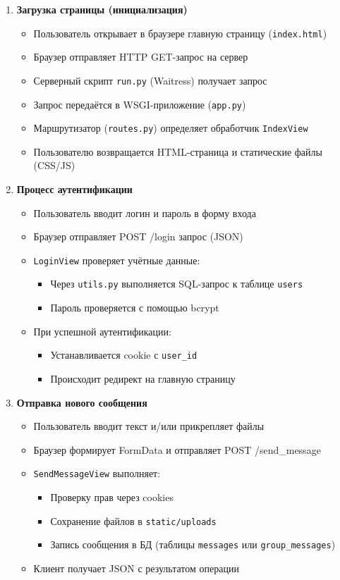 \begin{enumerate}[leftmargin=*,label=\textbf{\arabic*.}]
	\item \textbf{Загрузка страницы (инициализация)}
	\begin{itemize}
		\item Пользователь открывает в браузере главную страницу (\texttt{index.html})
		\item Браузер отправляет HTTP GET-запрос на сервер
		\item Серверный скрипт \texttt{run.py} (Waitress) получает запрос
		\item Запрос передаётся в WSGI-приложение (\texttt{app.py})
		\item Маршрутизатор (\texttt{routes.py}) определяет обработчик \texttt{IndexView}
		\item Пользователю возвращается HTML-страница и статические файлы (CSS/JS)
	\end{itemize}
	
	\item \textbf{Процесс аутентификации}
	\begin{itemize}
		\item Пользователь вводит логин и пароль в форму входа
		\item Браузер отправляет POST /login запрос (JSON)
		\item \texttt{LoginView} проверяет учётные данные:
		\begin{itemize}
			\item Через \texttt{utils.py} выполняется SQL-запрос к таблице \texttt{users}
			\item Пароль проверяется с помощью bcrypt
		\end{itemize}
		\item При успешной аутентификации:
		\begin{itemize}
			\item Устанавливается cookie с \texttt{user\_id}
			\item Происходит редирект на главную страницу
		\end{itemize}
	\end{itemize}
	
	\item \textbf{Отправка нового сообщения}
	\begin{itemize}
		\item Пользователь вводит текст и/или прикрепляет файлы
		\item Браузер формирует FormData и отправляет POST /send\_message
		\item \texttt{SendMessageView} выполняет:
		\begin{itemize}
			\item Проверку прав через cookies
			\item Сохранение файлов в \texttt{static/uploads}
			\item Запись сообщения в БД (таблицы \texttt{messages} или \texttt{group\_messages})
		\end{itemize}
		\item Клиент получает JSON с результатом операции
	\end{itemize}
	

\end{enumerate}
